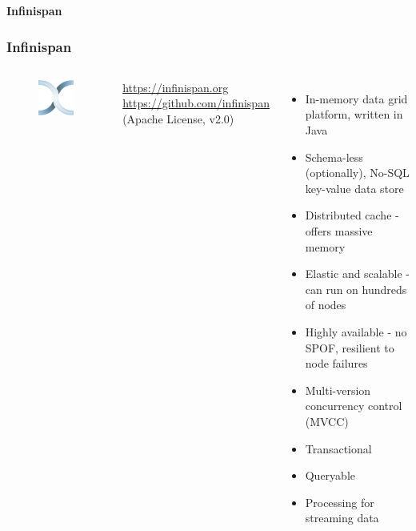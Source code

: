 \documentclass[10pt,utf8]{beamer}
\begin{document}


\begin{frame}
	\centering
	\huge{\textbf{Infinispan}}
\end{frame}

\begin{frame}
	\frametitle{Infinispan}
	\begin{columns}
		\begin{figure}
			\centering
			\includegraphics[width=3cm]{./img/infinispan.eps}
		\end{figure}
		\vspace{0.38cm}
		\color{blue}
			\url{https://infinispan.org}\\
			\vspace{0.1cm}
			\scriptsize{\url{https://github.com/infinispan}}\\
		\color{black}
		\scriptsize{(Apache License, v2.0)}
		\begin{itemize}
			\item In-memory data grid platform, written in Java
			\pause
			\item Schema-less (optionally), No-SQL key-value data store
			\pause
			\item Distributed cache - offers massive memory
			\pause
			\item Elastic and scalable - can run on hundreds of nodes
			\pause
			\item Highly available - no SPOF, resilient to node failures
			\pause
			\item Multi-version concurrency control (MVCC)
			\pause
			\item Transactional
			\pause
			\item Queryable
			\pause
			\item Processing for streaming data
		\end{itemize}
	\end{columns}
\end{frame}
\end{document}

